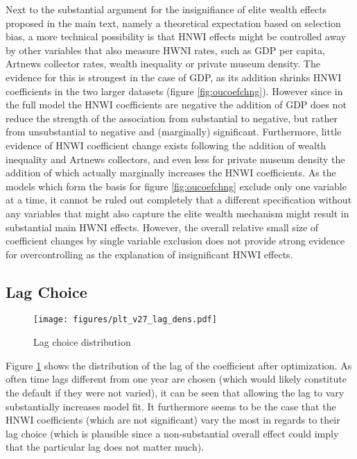 \documentclass[11pt]{article}
\begin{document}
Next to the substantial argument for the insignifiance of elite wealth effects proposed in the main text, namely a theoretical expectation based on selection bias, a more technical possibility is that HNWI effects might be controlled away by other variables that also measure HWNI rates, such as GDP per capita, Artnews collector rates, wealth inequality or private museum density.
The evidence for this is strongest in the case of GDP, as its addition shrinks HNWI coefficients in the two larger datasets (figure \ref{fig:oucoefchng}).
However since in the full model the HNWI coefficients are negative the addition of GDP does not reduce the strength of the association from substantial to negative, but rather from unsubstantial to negative and (marginally) significant. 
Furthermore, little evidence of HNWI coefficient change exists following the addition of wealth inequality and Artnews collectors, and even less for private museum density the addition of which actually marginally increases the HNWI coefficients.
As the models which form the basis for figure \ref{fig:oucoefchng} exclude only one variable at a time, it cannot be ruled out completely that a different specification without any variables that might also capture the elite wealth mechanism might result in substantial main HWNI effects.
However, the overall relative small size of coefficient changes by single variable exclusion does not provide strong evidence for overcontrolling as the explanation of insignificant HNWI effects. 





\subsection{Lag Choice}
\label{app_lagchoice}
\begin{figure}[htbp]
\centering
\texttt{[image: figures/plt\_v27\_lag\_dens.pdf]}
\caption{\label{fig:lag_dens}Lag choice distribution}
\end{figure}

Figure \ref{fig:lag_dens} shows the distribution of the lag of the coefficient after optimization.
As often time lags different from one year are chosen (which would likely constitute the default if they were not varied), it can be seen that allowing the lag to vary substantially increases model fit. 
It furthermore seems to be the case that the HNWI coefficients (which are not significant) vary the most in regards to their lag choice (which is plausible since a non-substantial overall effect could imply that the particular lag does not matter much). 
\end{document}

